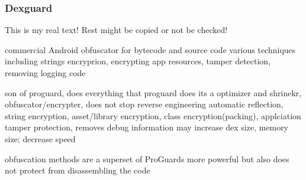 \subsubsection{Dexguard} \label{subsubsection:counter-reengineering-optobf-dexguard}
This is my real text! Rest might be copied or not be checked!


%
commercial Android obfuscator for bytecode and source code
various techniques including strings encryprion, encrypting app resources, tamper detection, removing logging code
\cite{kovachevaMaster}
%


son of proguard, does everything that proguard does
its a optimizer and shrinekr, obfuscator/encrypter, does not stop reverse engineering
automatic reflection, string encryption, asset/library encryption, class encryption(packing), applciation tamper protection, removes debug information
may increase dex size, memory size; decrease speed
\cite{strazzareLevel0}

obfuscation methods are a superset of ProGuards
more powerful but also does not protect from disassembling the code
